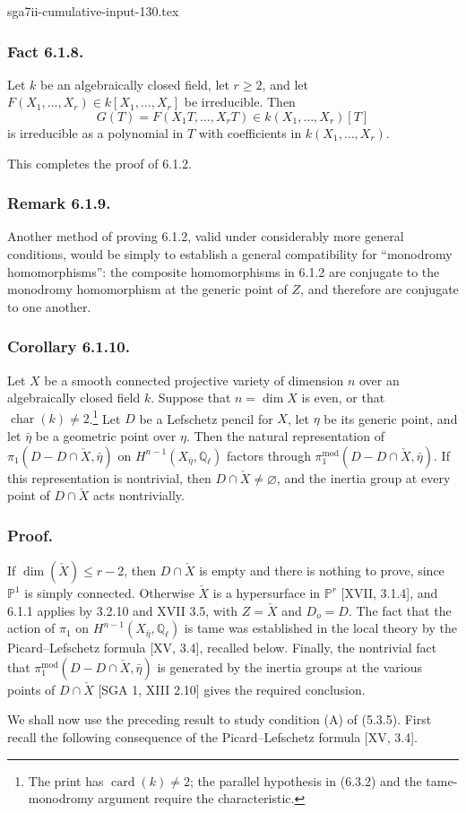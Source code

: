 \begin{filecontents*}{sga7ii-cumulative-input-130.tex}
\subsubsection*{Fact 6.1.8.}
Let $k$ be an algebraically closed field, let $r\ge2$, and let
$F(X_1,\ldots,X_r)\in k[X_1,\ldots,X_r]$ be irreducible.  Then
\[
G(T)=F(X_1T,\ldots,X_rT)\in k(X_1,\ldots,X_r)[T]
\]
is irreducible as a polynomial in $T$ with coefficients in
$k(X_1,\ldots,X_r)$.

This completes the proof of 6.1.2.

\subsubsection*{Remark 6.1.9.}
Another method of proving 6.1.2, valid under considerably more general
conditions, would be simply to establish a general compatibility for
``monodromy homomorphisms'': the composite homomorphisms in 6.1.2 are
conjugate to the monodromy homomorphism at the generic point of $Z$, and
therefore are conjugate to one another.

\subsubsection*{Corollary 6.1.10.}
Let $X$ be a smooth connected projective variety of dimension $n$ over an
algebraically closed field $k$.  Suppose that $n=\dim X$ is even, or that
$\operatorname{char}(k)\ne2$.\footnote{The print has
$\operatorname{card}(k)\ne2$; the parallel hypothesis in (6.3.2) and the
tame-monodromy argument require the characteristic.}
Let $D$ be a Lefschetz pencil for $X$, let $\eta$ be its generic point,
and let $\bar\eta$ be a geometric point over $\eta$.  Then the natural
representation of
$\pi_1(D-D\cap\check X,\bar\eta)$ on
$H^{n-1}(X_{\bar\eta},\mathbb Q_\ell)$ factors through
$\pi_1^{\mathrm{mod}}(D-D\cap\check X,\bar\eta)$.  If this
representation is nontrivial, then $D\cap\check X\ne\varnothing$, and
the inertia group at every point of $D\cap\check X$ acts nontrivially.

\subsubsection*{Proof.}
If $\dim(\check X)\le r-2$, then $D\cap\check X$ is empty and there is
nothing to prove, since $\mathbb P^1$ is simply connected.  Otherwise
$\check X$ is a hypersurface in $\mathbb P^r$ [XVII, 3.1.4], and 6.1.1
applies by 3.2.10 and XVII 3.5, with $Z=\check X$ and $D_o=D$.  The fact
that the action of $\pi_1$ on
$H^{n-1}(X_{\bar\eta},\mathbb Q_\ell)$ is tame was established in the
local theory by the Picard--Lefschetz formula [XV, 3.4], recalled below.
Finally, the nontrivial fact that
$\pi_1^{\mathrm{mod}}(D-D\cap\check X,\bar\eta)$ is generated by the
inertia groups at the various points of $D\cap\check X$ [SGA 1, XIII
2.10] gives the required conclusion.

We shall now use the preceding result to study condition (A) of (5.3.5).
First recall the following consequence of the Picard--Lefschetz formula
[XV, 3.4].
\end{filecontents*}
